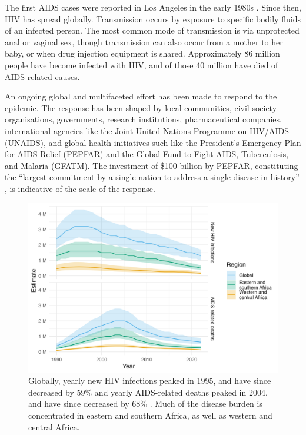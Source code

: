 \documentclass[a4paper, nobind]{templates/ociamthesis}
\begin{document}
The first AIDS cases were reported in Los Angeles in the early 1980s \autocite{gottlieb1981pneumocystis,barre1983isolation}.
Since then, HIV has spread globally.
Transmission occurs by exposure to specific bodily fluids of an infected person.
The most common mode of transmission is via unprotected anal or vaginal sex, though transmission can also occur from a mother to her baby, or when drug injection equipment is shared.
Approximately 86 million people have become infected with HIV, and of those 40 million have died of AIDS-related causes.

An ongoing global and multifaceted effort has been made to respond to the epidemic.
The response has been shaped by local communities, civil society organisations, governments, research institutions, pharmaceutical companies, international agencies like the Joint United Nations Programme on HIV/AIDS (UNAIDS), and global health initiatives such like the President's Emergency Plan for AIDS Relief (PEPFAR) and the Global Fund to Fight AIDS, Tuberculosis, and Malaria (GFATM).
The investment of \$100 billion by PEPFAR, constituting the ``largest commitment by a single nation to address a single disease in history'' \autocite{pepfar2022}, is indicative of the scale of the response.



\begin{figure}

{\centering \includegraphics[width=0.95\linewidth]{figures/hiv-aids/overall-picture} 

}

\caption{Globally, yearly new HIV infections peaked in 1995, and have since decreased by 59\% and yearly AIDS-related deaths peaked in 2004, and have since decreased by 68\% \autocite{unaids2023aidsinfo}. Much of the disease burden is concentrated in eastern and southern Africa, as well as western and central Africa.}\label{fig:overall-picture}
\end{figure}
\end{document}

